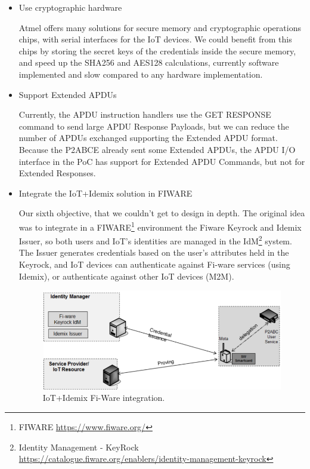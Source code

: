 \begin{itemize}
	
	\item Use cryptographic hardware
	
	Atmel offers many solutions for secure memory and cryptographic operations chips, with serial interfaces for the IoT devices. We could benefit from this chips by storing the secret keys of the credentials inside the secure memory, and speed up the SHA256 and AES128 calculations, currently software implemented and slow compared to any hardware implementation. 
	
	
	
	\item Support Extended APDUs
	
	Currently, the APDU instruction handlers use the GET RESPONSE command to send large APDU Response Payloads, but we can reduce the number of APDUs exchanged supporting the Extended APDU format. Because the P2ABCE already sent some Extended APDUs, the APDU I/O interface in the PoC has support for Extended APDU Commands, but not for Extended Responses.
	
	\item Integrate the IoT+Idemix solution in FIWARE
	
	Our sixth objective, that we couldn't get to design in depth. The original idea was to integrate in a FIWARE\footnote{FIWARE \url{https://www.fiware.org/}} environment the Fiware Keyrock and Idemix Issuer, so both users and IoT's identities are managed in the IdM\footnote{Identity Management - KeyRock \url{https://catalogue.fiware.org/enablers/identity-management-keyrock}} system. The Issuer generates credentials based on the user’s attributes held in the Keyrock, and IoT devices can authenticate against Fi-ware services (using Idemix), or authenticate against other IoT devices (M2M).
	
	\begin{figure}[bth]
		\begin{center}
			\includegraphics[width=0.8\linewidth]{gfx/fiware}
		\end{center}
		\caption{IoT+Idemix Fi-Ware integration.}
		\label{fig:fiware}
	\end{figure}


\end{itemize}
